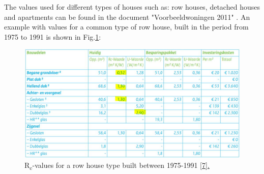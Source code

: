 The values used for different types of houses such as: row houses, detached houses and apartments can be found in the document "Voorbeeldwoningen 2011" \cite{VOORBEELD}. An example with values for a common type of row house, built in the period from 1975 to 1991 is shown in Fig.\ref{row_house}:


\begin{figure}[H]
	\centering
	\includegraphics[width=0.8\columnwidth]{Pictures/row_house_1975-1991.JPG}
	\caption[Short title]{R\textsubscript{c}-values for a row house type built between 1975-1991 \href{Voorbeeldwoningen 2011 bestaande bouw.pdf}{[7].}}
	\label{row_house}
\end{figure} 


\newpage
